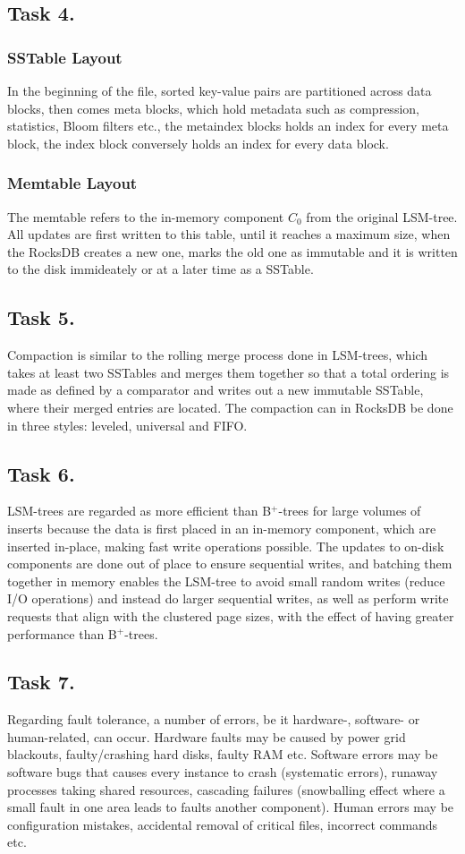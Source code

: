 \documentclass[12pt, titlepage]{report}
\begin{document}
\subsection*{Task 4.}
\subsubsection{SSTable Layout}
In the beginning of the file, sorted key-value pairs are partitioned across data blocks, then comes meta blocks, which hold metadata such as compression, statistics, Bloom filters etc., the metaindex blocks holds an index for every meta block, the index block conversely holds an index for every data block.
\subsubsection{Memtable Layout}
The memtable refers to the in-memory component $C_0$ from the original LSM-tree. All updates are first written to this table, until it reaches a maximum size, when the RocksDB creates a new one, marks the old one as immutable and it is written to the disk immideately or at a later time as a SSTable.
\subsection*{Task 5.}
Compaction is similar to the rolling merge process done in LSM-trees, which takes at least two SSTables and merges them together so that a total ordering is made as defined by a comparator and writes out a new immutable SSTable, where their merged entries are located. The compaction can in RocksDB be done in three styles: leveled, universal and FIFO.
\subsection*{Task 6.}
LSM-trees are regarded as more efficient than
B$^+$-trees for large volumes of inserts because the data is first placed in an in-memory component, which are inserted in-place, making fast write operations possible. The updates to on-disk components are done out of place to ensure sequential writes, and batching them together in memory enables the LSM-tree to avoid small random writes (reduce I/O operations) and instead do larger sequential writes, as well as perform write requests that align with the clustered page sizes, with the effect of having greater performance than B$^+$-trees.
\subsection*{Task 7.}
Regarding fault tolerance, a number of errors, be it hardware-, software- or human-related, can occur. Hardware faults may be caused by power grid blackouts, faulty/crashing hard disks, faulty RAM etc. Software errors may be software bugs that causes every instance to crash (systematic errors), runaway processes taking shared resources, cascading failures (snowballing effect where a small fault in one area leads to faults another component). Human errors may be configuration mistakes, accidental removal of critical files, incorrect commands etc.
\end{document}
